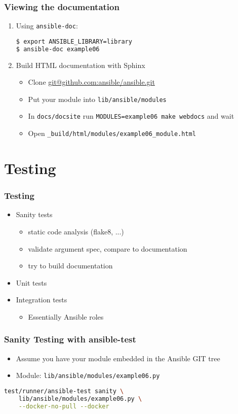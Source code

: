 \documentclass{beamer}
\begin{document}
  \begin{frame}[fragile]
    \frametitle{Viewing the documentation}
    \begin{enumerate}
      \item Using \lstinline{ansible-doc}:
\begin{lstlisting}[language=bash, numbers=none]
$ export ANSIBLE_LIBRARY=library
$ ansible-doc example06
\end{lstlisting}
      \item<2-> Build HTML documentation with Sphinx
      \begin{itemize}
        \item Clone \url{git@github.com:ansible/ansible.git}
        \item Put your module into \lstinline{lib/ansible/modules}
        \item In \lstinline{docs/docsite} run \lstinline{MODULES=example06 make webdocs} and wait
        \item Open \lstinline{_build/html/modules/example06_module.html}
      \end{itemize}
    \end{enumerate}
  \end{frame}

  \section{Testing}
  \begin{frame}
    \frametitle{Testing}
    \begin{itemize}
      \item Sanity tests
      \begin{itemize}
        \item static code analysis (flake8, ...)
        \item validate argument spec, compare to documentation
        \item try to build documentation
      \end{itemize}
      \item Unit tests
      \item Integration tests
      \begin{itemize}
        \item Essentially Ansible roles
      \end{itemize}
    \end{itemize}
  \end{frame}

  \begin{frame}[fragile]
    \frametitle{Sanity Testing with ansible-test}
    \begin{itemize}
      \item Assume you have your module embedded in the Ansible GIT tree
      \item Module: \lstinline{lib/ansible/modules/example06.py}
    \end{itemize}

\begin{lstlisting}[language=bash, numbers=none]
test/runner/ansible-test sanity \
    lib/ansible/modules/example06.py \
    --docker-no-pull --docker
\end{lstlisting}
  \end{frame}
\end{document}
